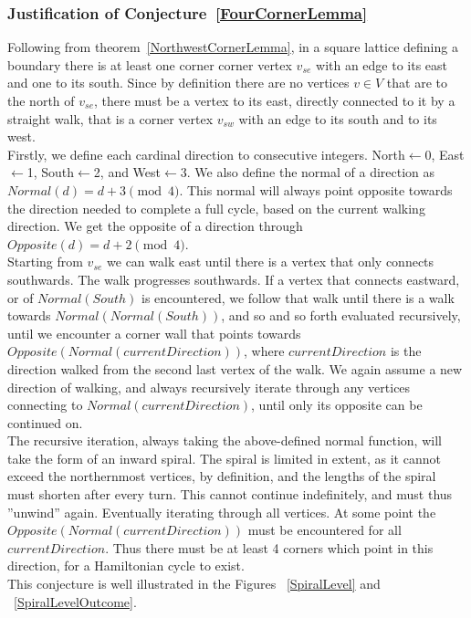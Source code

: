 \subsubsection*{Justification of Conjecture~\ref{FourCornerLemma}}
Following from theorem~\ref{NorthwestCornerLemma}, in a square lattice defining a boundary there is at least one corner corner vertex $v_{se}$ with an edge to its east and one to its south. Since by definition there are no vertices $v\in V$ that are to the north of $v_{se}$, there must be a vertex to its east, directly connected to it by a straight walk, that is a corner vertex $v_{sw}$ with an edge to its south and to its west. 
\\Firstly, we define each cardinal direction to consecutive integers. North$\leftarrow$0, East$\leftarrow$1, South$\leftarrow$2, and West$\leftarrow$3. We also define the normal of a direction as $Normal(d)= d+3 \pmod{4}$. This normal will always point opposite towards the direction needed to complete a full cycle, based on the current walking direction. We get the opposite of a direction through $Opposite(d)=d+2\pmod{4}$.
\\Starting from $v_{se}$ we can walk east until there is a vertex that only connects southwards. The walk progresses southwards. If a vertex that connects eastward, or of $Normal(South)$ is encountered, we follow that walk until there is a walk towards $Normal(Normal(South))$, and so and so forth evaluated recursively, until we encounter a corner wall that points towards $Opposite(Normal(currentDirection))$, where $currentDirection$ is the direction walked from the second last vertex of the walk. We again assume a new direction of walking, and always recursively iterate through any vertices connecting to $Normal(currentDirection)$, until only its opposite can be continued on.
\\The recursive iteration, always taking the above-defined normal function, will take the form of an inward spiral. The spiral is limited in extent, as it cannot exceed the northernmost vertices, by definition, and the lengths of the spiral must shorten after every turn. This cannot continue indefinitely, and must thus ''unwind'' again. Eventually iterating through all vertices. At some point the $Opposite(Normal(currentDirection))$ must be encountered for all $currentDirection$. Thus there must be at least 4 corners which point in this direction, for a Hamiltonian cycle to exist.\autocite{myself}
\\This conjecture is well illustrated in the Figures ~\ref{SpiralLevel} and ~\ref{SpiralLevelOutcome}.
